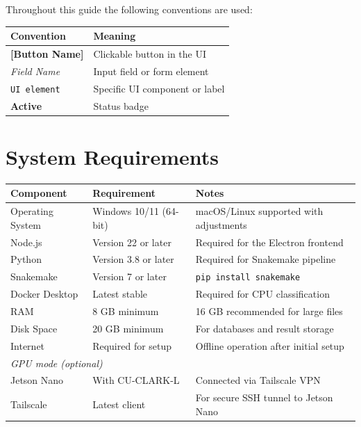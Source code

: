 \documentclass[12pt,a4paper]{report}
\newcommand{\btn}[1]{\textbf{\textcolor{primary}{[#1]}}}
\newcommand{\field}[1]{\textit{#1}}
\newcommand{\uielem}[1]{\texttt{#1}}
\newcommand{\badge}[2]{\colorbox{#1!20}{\textcolor{#1!70!black}{\small\textbf{#2}}}}
\begin{document}
Throughout this guide the following conventions are used:

\begin{center}
\begin{tabular}{ll}
  \toprule
  \textbf{Convention} & \textbf{Meaning} \\
  \midrule
  \btn{Button Name}      & Clickable button in the UI \\
  \field{Field Name}     & Input field or form element \\
  \uielem{UI element}    & Specific UI component or label \\
  \badge{success}{Active} & Status badge \\
  \bottomrule
\end{tabular}
\end{center}

\section{System Requirements}

\begin{center}
\begin{tabularx}{\textwidth}{lXl}
  \toprule
  \textbf{Component} & \textbf{Requirement} & \textbf{Notes} \\
  \midrule
  Operating System  & Windows 10/11 (64-bit) & macOS/Linux supported with adjustments \\
  Node.js           & Version 22 or later   & Required for the Electron frontend \\
  Python            & Version 3.8 or later  & Required for Snakemake pipeline \\
  Snakemake         & Version 7 or later    & \texttt{pip install snakemake} \\
  Docker Desktop    & Latest stable         & Required for CPU classification \\
  RAM               & 8 GB minimum          & 16 GB recommended for large files \\
  Disk Space        & 20 GB minimum         & For databases and result storage \\
  Internet          & Required for setup    & Offline operation after initial setup \\
  \midrule
  \multicolumn{3}{l}{\textit{GPU mode (optional)}} \\
  Jetson Nano       & With CU-CLARK-L       & Connected via Tailscale VPN \\
  Tailscale         & Latest client         & For secure SSH tunnel to Jetson Nano \\
  \bottomrule
\end{tabularx}
\end{center}
\end{document}
